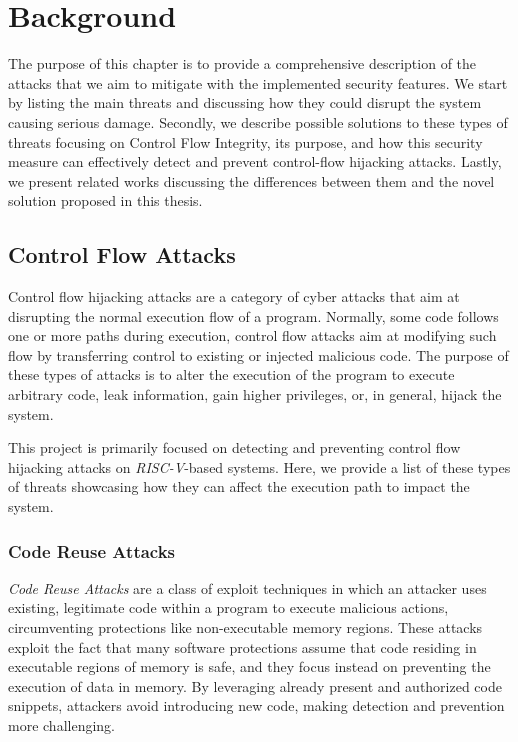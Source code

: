\chapter{Background}
\label{cha:background}

The purpose of this chapter is to provide a comprehensive description of the
attacks that we aim to mitigate with the implemented security features. We start
by listing the main threats and discussing how they could disrupt the system causing
serious damage. Secondly, we describe possible solutions to these types of threats
focusing on Control Flow Integrity, its purpose, and how this security measure can
effectively detect and prevent control-flow hijacking attacks. Lastly, we present
related works discussing the differences between them and the novel solution proposed
in this thesis.

\section{Control Flow Attacks}
\label{sec:background_cfa}

Control flow hijacking attacks are a category of cyber attacks that aim at
disrupting the normal execution flow of a program. Normally, some code follows
one or more paths during execution, control flow attacks aim at modifying such flow
by transferring control to existing or injected malicious code. The purpose of
these types of attacks is to alter the execution of the program to execute
arbitrary code, leak information, gain higher privileges, or, in general, hijack
the system.

This project is primarily focused on detecting and preventing control flow hijacking
attacks on \textit{RISC-V}-based systems. Here, we provide a list of these types
of threats showcasing how they can affect the execution path to impact the
system.

\subsection{Code Reuse Attacks}
\label{subsec:background_codereuse}

\textit{Code Reuse Attacks} are a class of exploit techniques in which an
attacker uses existing, legitimate code within a program to execute malicious actions,
circumventing protections like non-executable memory regions. These attacks exploit
the fact that many software protections assume that code residing in executable regions
of memory is safe, and they focus instead on preventing the execution of data in
memory. By leveraging already present and authorized code snippets, attackers
avoid introducing new code, making detection and prevention more challenging.

